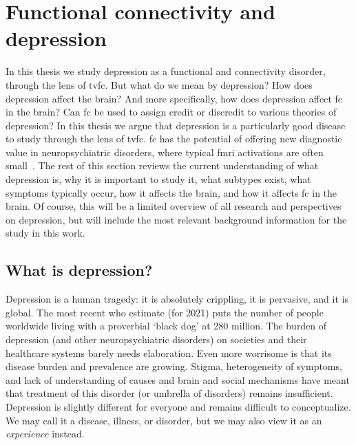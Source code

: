 \clearpage
\section{Functional connectivity and depression}\label{sec:fc-depression}

In this thesis we study depression as a functional and connectivity disorder, through the lens of \gls{tvfc}.
But what do we mean by depression?
How does depression affect the brain?
And more specifically, how does depression affect \gls{fc} in the brain?
Can \gls{fc} be used to assign credit or discredit to various theories of depression?
In this thesis we argue that depression is a particularly good disease to study through the lens of \gls{tvfc}.
\gls{fc} has the potential of offering new diagnostic value in neuropsychiatric disorders, where typical \gls{fmri} activations are often small~\parencite{Fornito2012}.
The rest of this section reviews the current understanding of what depression is, why it is important to study it, what subtypes exist, what symptoms typically occur, how it affects the brain, and how it affects \gls{fc} in the brain.
Of course, this will be a limited overview of all research and perspectives on depression, but will include the most relevant background information for the study in this work.

\subsection{What is depression?}\label{subsec:depression}

Depression is a human tragedy: it is absolutely crippling, it is pervasive, and it is global.
The most recent \gls{who} estimate (for 2021) puts the number of people worldwide living with a proverbial `black dog' at 280 million.
The burden of depression (and other neuropsychiatric disorders) on societies and their healthcare systems barely needs elaboration.
Even more worrisome is that its disease burden and prevalence are growing.
Stigma, heterogeneity of symptoms, and lack of understanding of causes and brain and social mechanisms have meant that treatment of this disorder (or umbrella of disorders) remains insufficient.
Depression is slightly different for everyone and remains difficult to conceptualize.
We may call it a disease, illness, or disorder, but we may also view it as an \emph{experience} instead.


